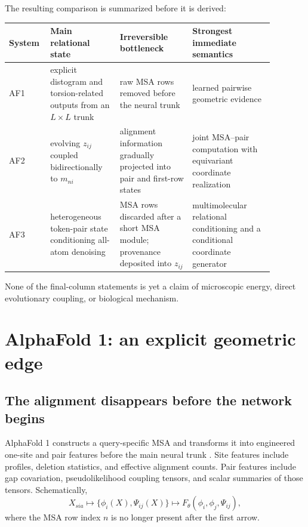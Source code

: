The resulting comparison is summarized before it is derived:
\begin{center}
\small
\begin{tabular}{>{\raggedright\arraybackslash}p{0.10\linewidth}
                >{\raggedright\arraybackslash}p{0.24\linewidth}
                >{\raggedright\arraybackslash}p{0.25\linewidth}
                >{\raggedright\arraybackslash}p{0.29\linewidth}}
\toprule
System & Main relational state & Irreversible bottleneck & Strongest immediate semantics \\
\midrule
AF1 & explicit distogram and torsion-related outputs from an $L\times L$ trunk & raw MSA rows
removed before the neural trunk & learned pairwise geometric evidence \\
AF2 & evolving $z_{ij}$ coupled bidirectionally to $m_{ni}$ & alignment information gradually
projected into pair and first-row states & joint MSA--pair computation with equivariant coordinate
realization \\
AF3 & heterogeneous token-pair state conditioning all-atom denoising & MSA rows discarded after a
short MSA module; provenance deposited into $z_{ij}$ & multimolecular relational conditioning and a
conditional coordinate generator \\
\bottomrule
\end{tabular}
\end{center}

None of the final-column statements is yet a claim of microscopic energy, direct evolutionary
coupling, or biological mechanism.

\section{AlphaFold 1: an explicit geometric edge}

\subsection{The alignment disappears before the network begins}

AlphaFold 1 constructs a query-specific MSA and transforms it into engineered one-site and pair
features before the main neural trunk \cite{senior2020}.  Site features include profiles, deletion
statistics, and effective alignment counts.  Pair features include gap covariation,
pseudolikelihood coupling tensors, and scalar summaries of those tensors.  Schematically,
\begin{equation}
X_{sia}
\longmapsto
\{\phi_i(X),\Psi_{ij}(X)\}
\longmapsto
F_\theta(\phi_i,\phi_j,\Psi_{ij}),
\label{eq:book-af1-compression}
\end{equation}
where the MSA row index $n$ is no longer present after the first arrow.

